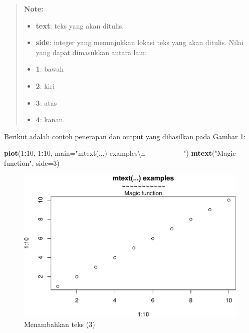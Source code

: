 \documentclass[]{book}
\newenvironment{Shaded}{\begin{snugshade}}{\end{snugshade}}
\newcommand{\KeywordTok}[1]{\textcolor[rgb]{0.13,0.29,0.53}{\textbf{#1}}}
\newcommand{\DataTypeTok}[1]{\textcolor[rgb]{0.13,0.29,0.53}{#1}}
\newcommand{\DecValTok}[1]{\textcolor[rgb]{0.00,0.00,0.81}{#1}}
\newcommand{\CharTok}[1]{\textcolor[rgb]{0.31,0.60,0.02}{#1}}
\newcommand{\StringTok}[1]{\textcolor[rgb]{0.31,0.60,0.02}{#1}}
\newcommand{\OperatorTok}[1]{\textcolor[rgb]{0.81,0.36,0.00}{\textbf{#1}}}
\newcommand{\NormalTok}[1]{#1}
\providecommand{\tightlist}{%
  \setlength{\itemsep}{0pt}\setlength{\parskip}{0pt}}
\begin{document}
\begin{quote}
\textbf{Note: }

\begin{itemize}
\tightlist
\item
  \textbf{text}: teks yang akan ditulis.
\item
  \textbf{side}: integer yang menunjukkan lokasi teks yang akan ditulis.
  Nilai yang dapat dimasukkan antara lain:
\item
  \textbf{1}: bawah
\item
  \textbf{2}: kiri
\item
  \textbf{3}: atas
\item
  \textbf{4}: kanan.
\end{itemize}
\end{quote}

Berikut adalah contoh penerapan dan output yang dihasilkan pada Gambar
\ref{fig:text3}:

\begin{Shaded}
\begin{Highlighting}[]
\KeywordTok{plot}\NormalTok{(}\DecValTok{1}\OperatorTok{:}\DecValTok{10}\NormalTok{, }\DecValTok{1}\OperatorTok{:}\DecValTok{10}\NormalTok{, }
     \DataTypeTok{main=}\StringTok{"mtext(...) examples}\CharTok{\textbackslash{}n}\StringTok{~~~~~~~~~~~"}\NormalTok{)}
\KeywordTok{mtext}\NormalTok{(}\StringTok{"Magic function"}\NormalTok{, }\DataTypeTok{side=}\DecValTok{3}\NormalTok{)}
\end{Highlighting}
\end{Shaded}

\begin{figure}

{\centering \includegraphics[width=0.7\linewidth]{EnvStat_files/figure-latex/text3-1} 

}

\caption{Menambahkan teks (3)}\label{fig:text3}
\end{figure}
\end{document}
